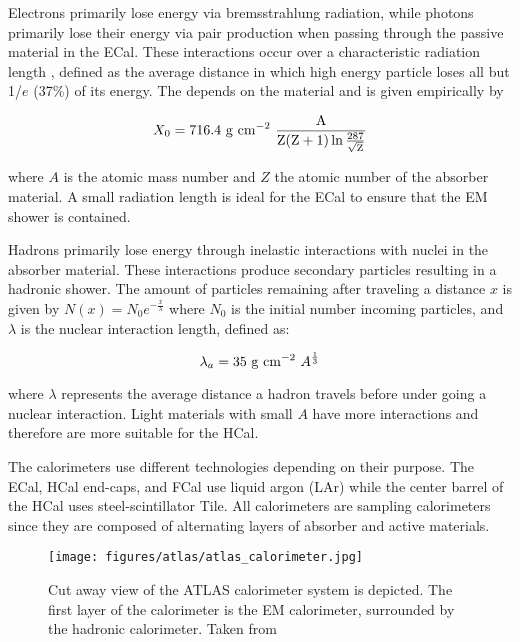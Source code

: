 Electrons primarily lose energy via bremsstrahlung radiation, while photons primarily lose their energy via pair production when passing through the passive material in the ECal. These interactions occur over a characteristic radiation length \radlength, defined as the average distance in which high energy particle loses all but 1/$e$ (37\%) of its energy. The \radlength{} depends on the material and is given empirically by

\begin{equation}
    \centering
    X_{0} = 716.4 \ \mathrm{g \ cm^{-2} \ \frac{A}{Z (Z+1) \ln{\frac{287}{\sqrt{Z}}}}}
    \label{eq:rad_length}
\end{equation}

\noindent{}where $A$ is the atomic mass number and $Z$ the atomic number of the absorber material. A small radiation length is ideal for the ECal to ensure that the EM shower is contained.

Hadrons primarily lose energy through inelastic interactions with nuclei in the absorber material. These interactions produce secondary particles resulting in a hadronic shower. The amount of particles remaining after traveling a distance $x$ is given by $N(x) = N_{0} e^{-\frac{x}{\lambda}}$ where $N_{0}$ is the initial number incoming particles, and $\lambda$ is the nuclear interaction length, defined as:

\begin{equation}
    \centering
    \lambda_{a} = 35 \ \mathrm{g \ cm^{-2}} \ A^{\frac{1}{3}}
    \label{eq:absorption_length}
\end{equation}

\noindent{} where $\lambda$ represents the average distance a hadron travels before under going a nuclear interaction. Light materials with small $A$ have more interactions and therefore are more suitable for the HCal\@.

The calorimeters use different technologies depending on their purpose. The ECal, HCal end-caps, and FCal use liquid argon (LAr) while the center barrel of the HCal uses steel-scintillator Tile. All calorimeters are sampling calorimeters since they are composed of alternating layers of absorber and active materials.

\begin{figure}
    \centering
    \texttt{[image: figures/atlas/atlas\_calorimeter.jpg]}
    \caption{Cut away view of the ATLAS calorimeter system is depicted. The first layer of the calorimeter is the EM calorimeter, surrounded by the hadronic calorimeter. Taken from~\cite{atlas_tile_calorimeter}}\label{fig:atlas_calorimeter}
\end{figure}